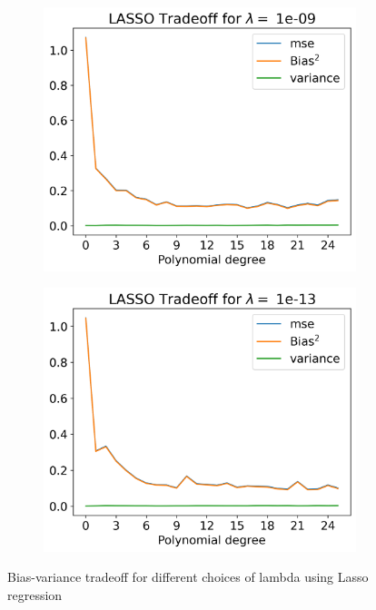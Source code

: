\documentclass[12pt]{article}
\begin{document}
\begin{figure}[H]
  \begin{subfigure}{.5\textwidth}
    \centering
    \includegraphics[width=\textwidth]{../figures/tradeoff_LASSO_1e-09real.png}
    \caption{}
    \label{fig:}
  \end{subfigure}
  \begin{subfigure}{.5\textwidth}
    \centering
    \includegraphics[width=\textwidth]{../figures/tradeoff_LASSO_1e-13real.png}
    \caption{}
    \label{fig:}
  \end{subfigure}
  \caption{Bias-variance tradeoff for different choices of lambda using Lasso regression}
  \label{fig:lasso_tradeoff_real}
\end{figure}
\end{document}
